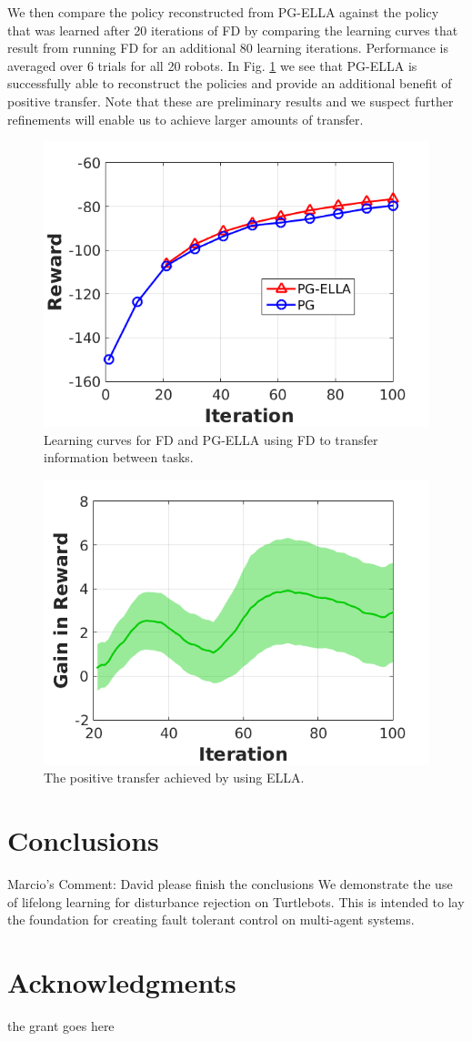 \documentclass{aamas2016}
\begin{document}
We then compare the policy reconstructed from PG-ELLA against the policy that was learned after 20 iterations of FD by comparing the learning curves that result from running FD for an additional 80 learning iterations. Performance is averaged over 6 trials for all 20 robots. In Fig. \ref{fig:reward} we see that PG-ELLA is successfully able to reconstruct the policies and provide an additional benefit of positive transfer. Note that these are preliminary results and we suspect further refinements will enable us to achieve larger amounts of transfer.


\begin{figure}[!htbp]
    \centering
        \includegraphics[width=.42\textwidth]{images/2016_2_3_reward.png}
        \caption{Learning curves for FD and PG-ELLA using FD to transfer information between tasks. }\label{fig:reward}
\end{figure}

\begin{figure}[!htbp]
    \centering
        \includegraphics[width=.42\textwidth]{images/2016_2_3_gain.png}
        \caption{The positive transfer achieved by using ELLA. }\label{fig:gain}
\end{figure}

\section{Conclusions}
{\color{red} Marcio's Comment: David please finish the conclusions}
We demonstrate the use of lifelong learning for disturbance rejection on Turtlebots. This is intended to lay the foundation for creating fault tolerant control on multi-agent systems.

\section*{Acknowledgments}
{\color{red} 
the grant goes here
}



%
\end{document}

